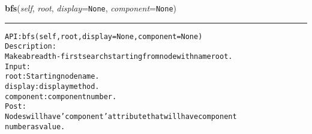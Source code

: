 \hspace{.8\funcindent}\begin{boxedminipage}{\funcwidth}

    \raggedright \textbf{bfs}(\textit{self}, \textit{root}, \textit{display}={\tt None}, \textit{component}={\tt None})

    \vspace{-1.5ex}

    \rule{\textwidth}{0.5\fboxrule}
\setlength{\parskip}{2ex}
\begin{alltt}

API: bfs(self, root, display = None, component=None)
Description:
Make a breadth-first search starting from node with name root.
Input:
    root: Starting node name.
    display: display method.
    component: component number.
Post:
    Nodes will have 'component' attribute that will have component
    number as value.
\end{alltt}

\setlength{\parskip}{1ex}
    \end{boxedminipage}

    \label{coinor:gimpy:graph:Graph:search}

    \vspace{0.5ex}

